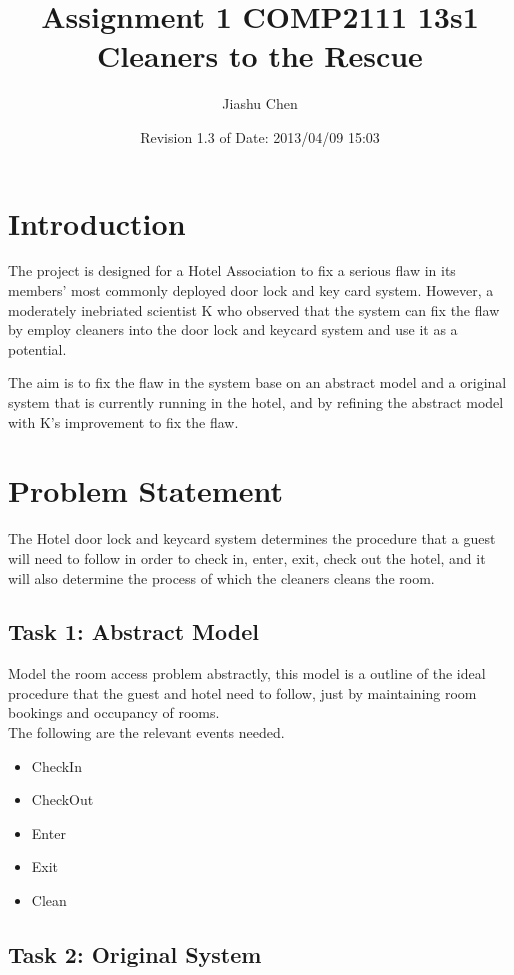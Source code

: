 \documentclass[a4paper]{article}
\title{\textbf{Assignment 1 COMP2111 13s1\\Cleaners to the Rescue}}
\author{Jiashu Chen\\
}
\date{Revision 1.3 of Date: 2013/04/09 15:03}
\begin{document}
\thispagestyle{empty}
\maketitle
\tableofcontents
\newpage
\setcounter{page}{1}

\section{Introduction}
\indent The project is designed for a Hotel Association to fix a serious flaw in its members' most commonly deployed door lock and key card system. However, a moderately inebriated scientist K who observed that the system can fix the flaw by employ cleaners into the door lock and keycard system and use it as a potential.

The aim is to fix the flaw in the system base on an abstract model and a original system that is currently running in the hotel, and by refining the abstract model with K's improvement to fix the flaw.

\section{Problem Statement}

The Hotel door lock and keycard system determines the procedure that a guest will need to follow in order to check in, enter, exit, check out the hotel, and it will also determine the process of which the cleaners cleans the room.
\subsection{Task 1: Abstract Model}
Model the room access problem abstractly, this model is a outline of the ideal procedure that the guest and hotel need to follow, just by maintaining room bookings and occupancy of rooms.\\
The following are the relevant events needed.
\begin{itemize}
\item CheckIn
\item CheckOut
\item Enter
\item Exit
\item Clean
\end{itemize}

\subsection{Task 2: Original System}
\end{document}

